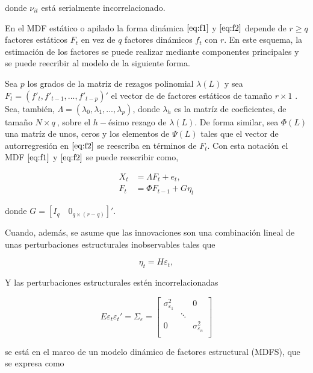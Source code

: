 \documentclass[a4paper,twoside,15pt]{article}
\begin{document}
donde $\nu_{it}$ está serialmente incorrelacionado.
 

En el MDF estático o apilado  la forma dinámica $\eqref{eq:f1}$ y $\eqref{eq:f2}$ depende de $r \geq q$ factores estáticos $F_t$ en vez de $q$ factores dinámicos $f_t$ con $r$. En este esquema, la estimación de los factores se puede realizar mediante componentes principales y se puede reecribir al modelo de la siguiente forma.

Sea $p$ los grados de la matriz de rezagos polinomial $\lambda(L)$ y sea $F_t=\left(f'_{t}, f'_{t-1},...,f'_{t-p}\right)'$ el vector de de factores estáticos de tamaño $r\times 1$ . Sea, también,  $\Lambda = \left(\lambda_0, \lambda_1,...,\lambda_p\right)$, donde 
$\lambda_h$ es la matríz de coeficientes, de tamaño $N \times q\:$, sobre el $h-$ésimo rezago de $\lambda(L)$. De forma similar, sea $\Phi(L)$ una matríz de unos, ceros y los elementos de $\Psi(L)$ tales que el vector de autorregresión en $\eqref{eq:f2}$ se reescriba en términos de $F_t$. Con esta notación el MDF $\eqref{eq:f1}$ y $\eqref{eq:f2}$ se puede reescribir como,


\begin{align*}
	X_t & = \Lambda F_t + e_t, \label{eq:Xt} \tag{4} \\
	F_t & = \Phi F_{t-1}+G \eta_t \label{eq:Ft} \tag{5}
\end{align*}

donde $G=\left[I_q\quad 0_{q\times(r-q)}\right]'$.

Cuando, además, se asume que las innovaciones son una combinación lineal de unas perturbaciones estructurales inobservables tales que 

\begin{equation*}
	\eta_t=H\varepsilon_t, \label{eq:sup20} \tag{6}
\end{equation*}

Y las perturbaciones estructurales estén incorrelacionadas

\begin{equation*}
E\varepsilon_t\varepsilon_t'=\Sigma_{\varepsilon}=\begin{bmatrix}
	\sigma^2_{\varepsilon_1} &  & 0 \\
	& \ddots  &  \\
	0 &  & \sigma^2_{\varepsilon_n} \\
\end{bmatrix}
\end{equation*}



se está en el marco de un modelo dinámico de factores estructural (MDFS), que se expresa como
\end{document}
